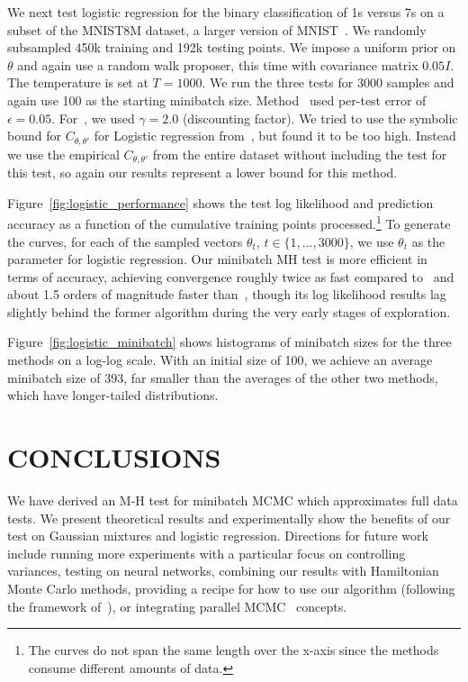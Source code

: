 \documentclass[twoside]{article} \usepackage{aistats2017}
\begin{document}
We next test logistic regression for the binary classification of 1s
versus 7s on a subset of the MNIST8M dataset, a larger version of
MNIST~\citep{lecun-mnisthandwrittendigit-2010}. We randomly subsampled
450k training and 192k testing points.
We impose a uniform prior on $\theta$ and again use a random walk
proposer, this time with covariance matrix $0.05I$. The temperature is
set at $T=1000$. We run the three tests for 3000 samples and again use 100
as the starting minibatch size. Method~\citet{cutting_mh_2014} used
per-test error of $\epsilon=0.05$.  For~\citet{icml2014c1_bardenet14},
we used $\gamma=2.0$ (discounting factor). We tried to use the
symbolic bound for $C_{\theta,\theta'}$ for Logistic regression
from~\citet{icml2014c1_bardenet14}, but found it to be too high. Instead we use
the empirical $C_{\theta,\theta'}$ from the entire dataset without including the
test for this test, so again our results represent a lower bound for this
method.

Figure~\ref{fig:logistic_performance} shows the test log likelihood and
prediction accuracy as a function of the cumulative training points
processed.\footnote{The curves do not span the same length over the x-axis since
the methods consume different amounts of data.} To generate the curves, for each
of the sampled vectors $\theta_t$, $t\in\{1,\ldots,3000\}$, we use $\theta_t$ as
the parameter for logistic regression.  Our minibatch MH test is more efficient
in terms of accuracy, achieving convergence roughly twice as fast compared
to~\citet{cutting_mh_2014} and about 1.5 orders of magnitude faster
than~\citet{icml2014c1_bardenet14}, though its log likelihood results lag
slightly behind the former algorithm during the very early stages of
exploration.

Figure~\ref{fig:logistic_minibatch} shows histograms of minibatch sizes for the
three methods on a log-log scale. With an initial size of 100, we achieve an
average minibatch size of 393, far smaller than the averages of the other two
methods, which have longer-tailed distributions.



\section{CONCLUSIONS}\label{sec:conclusion}

We have derived an M-H test for minibatch MCMC which approximates full data
tests. We present theoretical results and experimentally show the benefits of
our test on Gaussian mixtures and logistic regression. Directions for future
work include running more experiments with a particular focus on controlling
variances, testing on neural networks, combining our results with Hamiltonian
Monte Carlo methods, providing a recipe for how to use our algorithm (following
the framework of~\citet{sgmcmc_2015}), or integrating parallel
MCMC~\citep{conf/uai/AngelinoKWSA14,conf/icml/AhnSW14} concepts.
\end{document}
